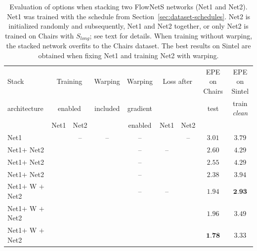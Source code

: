 \documentclass[10pt,twocolumn,letterpaper]{article}%
\newcommand{\my}{\textcolor{dgreen}{\ding{51}}}%
\newcommand{\mn}{\textcolor{dred}{\ding{55}}}%
\newcommand{\chairs}{\mbox{Chairs}\xspace}
\newcommand{\Slong}{S_\mathit{long}}
\newcommand{\neta}{Net1\xspace}
\newcommand{\netb}{Net2\xspace}
\begin{document}
\begin{table}[t]
  \begin{center}
  \begin{tabular}{|l||c|c|c|c|c|c||c|c|}
  \hline
  Stack                     & \multicolumn{2}{c|}{Training}  & Warping  & Warping  & \multicolumn{2}{c||}{Loss after}  & EPE on \chairs & EPE on Sintel  \\
  architecture              & \multicolumn{2}{c|}{enabled}  & included & gradient & \multicolumn{2}{c||}{}     & test      & train \textit{clean}    \\
  \cline{2-3}
  \cline{6-7}
                            & \neta     & \netb             &          & enabled  & \neta     & \netb                  &           &     \\
                            
  \hline \hline 
  
  \neta                     & \my       & --                & --       & --       & \my       & --                      & $3.01$   & $3.79$ \\
  \neta $+$ \netb           & \mn       & \my               & \mn      & --       & --        & \my                     & $2.60$   & $4.29$ \\
  \neta $+$ \netb           & \my       & \my               & \mn      & --       & \mn       & \my                     & $2.55$   & $4.29$ \\
  \neta $+$ \netb           & \my       & \my               & \mn      & --       & \my       & \my                     & $2.38$   & $3.94$ \\
  \rowcolor{gray!15}
  \neta $+$ W $+$ \netb     & \mn       & \my               & \my      & --       & --        & \my                     & $1.94$   & $\textbf{2.93}$ \\
  \neta $+$ W $+$ \netb     & \my       & \my               & \my      & \my      & \mn       & \my                     & $1.96$   & $3.49$ \\
  \neta $+$ W $+$ \netb     & \my       & \my               & \my      & \my      & \my       & \my                     & $\textbf{1.78}$ & $3.33$ \\
  \hline
  \end{tabular} 
  \end{center}
  \caption{
  Evaluation of options when stacking two FlowNetS networks (\neta and \netb). \neta was trained with the \chairsToThings schedule from Section~\ref{sec:dataset-schedules}. \netb is initialized randomly and subsequently, \neta and \netb together, or only \netb is trained on \chairs with $\Slong$; see text for details. When training without warping, the stacked network overfits to the \chairs dataset. The best results on Sintel are obtained when fixing \neta and training \netb with warping.  
  \label{tab:two_stack_results}
  } 
\end{table}
\end{document}
